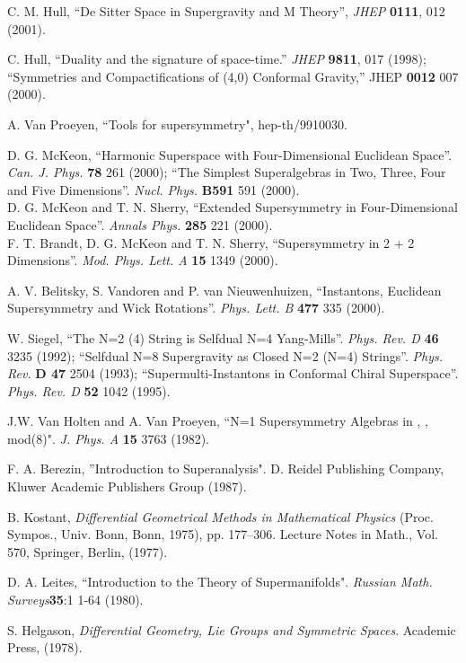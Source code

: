\documentclass[a4paper,12pt]{article}
\begin{document}
\begin{thebibliography}{99}
C. M. Hull, ``De Sitter Space in Supergravity and M Theory'', {\it
JHEP} {\bf 0111}, 012 (2001).





   C. Hull, ``Duality and the signature of space-time.''
{\it JHEP} {\bf 9811}, 017 (1998); ``Symmetries and
Compactifications of (4,0) Conformal Gravity,'' JHEP {\bf 0012}
007 (2000).

 A. Van Proeyen, ``Tools for supersymmetry", hep-th/9910030.




D. G. McKeon, ``Harmonic Superspace with Four-Dimensional
Euclidean Space''. {\it  Can.  J.  Phys.} {\bf 78} 261 (2000);
``The Simplest Superalgebras in Two, Three, Four and Five
Dimensions''. {\it  Nucl.  Phys.} {\bf B591} 591 (2000).\\ D. G.
McKeon and T. N. Sherry, ``Extended Supersymmetry in
Four-Dimensional Euclidean Space''.  {\it Annals Phys.}  {\bf 285}
221 (2000). \\F. T. Brandt, D. G. McKeon and T. N. Sherry,
``Supersymmetry in 2 + 2 Dimensions''. {\it  Mod.  Phys.  Lett. A}
{\bf 15} 1349 (2000).

 A. V. Belitsky, S. Vandoren and P. van Nieuwenhuizen,
``Instantons, Euclidean Supersymmetry and Wick Rotations''. {\it
Phys.  Lett. B} {\bf 477} 335 (2000).

 W. Siegel,
``The N=2 (4) String is Selfdual N=4 Yang-Mills''. {\it Phys. Rev.
D } {\bf 46} 3235 (1992); ``Selfdual N=8 Supergravity as Closed
N=2 (N=4) Strings''. {\it Phys.  Rev. } {\bf D 47} 2504 (1993);
``Supermulti-Instantons in Conformal Chiral Superspace''. {\it
Phys.  Rev. D} {\bf  52} 1042 (1995).



 J.W. Van Holten and  A. Van Proeyen,
``N=1 Supersymmetry Algebras in \coordHE{}, \coordHE{}, \coordHE{} mod(8)".
{\it J. Phys. A} {\bf  15} 3763 (1982).

 F. A. Berezin, ''Introduction to Superanalysis". D.
Reidel Publishing Company, Kluwer Academic Publishers Group
(1987).

 B. Kostant, {\it Differential Geometrical Methods in Mathematical Physics} (Proc.
Sympos., Univ. Bonn, Bonn, 1975), pp. 177--306. Lecture Notes in
Math., Vol. 570, Springer, Berlin, (1977).


 D. A. Leites, ``Introduction to the Theory of
Supermanifolds". {\it Russian Math. Surveys}{\bf 35}:1 1-64
(1980).

 S. Helgason, {\it Differential Geometry, Lie Groups and Symmetric Spaces}.
Academic Press, (1978).




\end{thebibliography}
\end{document}
